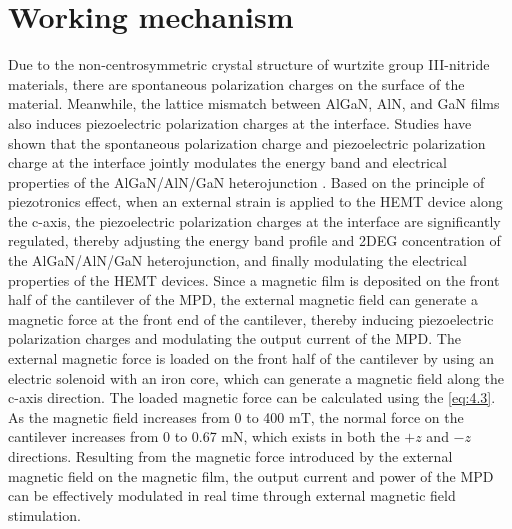 \section{Working mechanism}
\label{sec:Working mechanism}

Due  to the non-centrosymmetric crystal  structure of  wurtzite group  III-nitride materials, there are spontaneous polarization  charges on the surface  of the material. Meanwhile, the lattice mismatch  between AlGaN, AlN, and GaN films also induces  piezoelectric polarization charges at the interface. Studies have shown that the spontaneous polarization charge and piezoelectric polarization charge at the interface jointly modulates the energy band  and electrical properties of the  AlGaN/AlN/GaN heterojunction \cite{ambacher2000two,romanov2006strain}. Based on the principle of piezotronics  effect, when an external  strain is applied to the  HEMT device along the c-axis, the piezoelectric polarization charges at the interface are significantly regulated, thereby adjusting the energy band profile and 2DEG  concentration of the AlGaN/AlN/GaN heterojunction, and finally modulating the electrical properties of the HEMT devices. Since a  magnetic film is deposited on the front half of the cantilever  of the MPD, the external magnetic field can generate a magnetic force  at the front end of  the cantilever, thereby inducing piezoelectric polarization charges  and modulating the output current of the MPD. The external magnetic force is loaded on the front half of the cantilever by using an electric solenoid with an iron core, which can generate a magnetic field along the c-axis direction. The loaded magnetic force can be calculated using the \autoref{eq:4.3}. As the magnetic field increases from 0 to 400 \unit{\milli\tesla}, the normal force on the cantilever increases from 0 to 0.67 \unit{\mN}, which exists in both the $+z$ and $-z$ directions. Resulting from the magnetic force introduced by the external magnetic field on the magnetic film, the output current and power of the MPD can be effectively modulated in real time through external magnetic field stimulation. 

